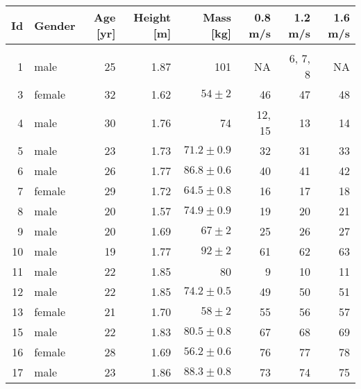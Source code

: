 \begin{tabular}{rlrrrrrr}
\toprule
 Id &  Gender &  Age [yr] & Height [m] &                     Mass [kg] & 0.8 m/s &  1.2 m/s & 1.6 m/s \\
\midrule
    &         &           &            &                               &         &          &         \\
  1 &    male &        25 &       1.87 &                           101 &      NA &  6, 7, 8 &      NA \\
  3 &  female &        32 &       1.62 &      $54\pm2$ &      46 &       47 &      48 \\
  4 &    male &        30 &       1.76 &                            74 &  12, 15 &       13 &      14 \\
  5 &    male &        23 &       1.73 &  $71.2\pm0.9$ &      32 &       31 &      33 \\
  6 &    male &        26 &       1.77 &  $86.8\pm0.6$ &      40 &       41 &      42 \\
  7 &  female &        29 &       1.72 &  $64.5\pm0.8$ &      16 &       17 &      18 \\
  8 &    male &        20 &       1.57 &  $74.9\pm0.9$ &      19 &       20 &      21 \\
  9 &    male &        20 &       1.69 &      $67\pm2$ &      25 &       26 &      27 \\
 10 &    male &        19 &       1.77 &      $92\pm2$ &      61 &       62 &      63 \\
 11 &    male &        22 &       1.85 &                            80 &       9 &       10 &      11 \\
 12 &    male &        22 &       1.85 &  $74.2\pm0.5$ &      49 &       50 &      51 \\
 13 &  female &        21 &       1.70 &      $58\pm2$ &      55 &       56 &      57 \\
 15 &    male &        22 &       1.83 &  $80.5\pm0.8$ &      67 &       68 &      69 \\
 16 &  female &        28 &       1.69 &  $56.2\pm0.6$ &      76 &       77 &      78 \\
 17 &    male &        23 &       1.86 &  $88.3\pm0.8$ &      73 &       74 &      75 \\
\bottomrule
\end{tabular}
